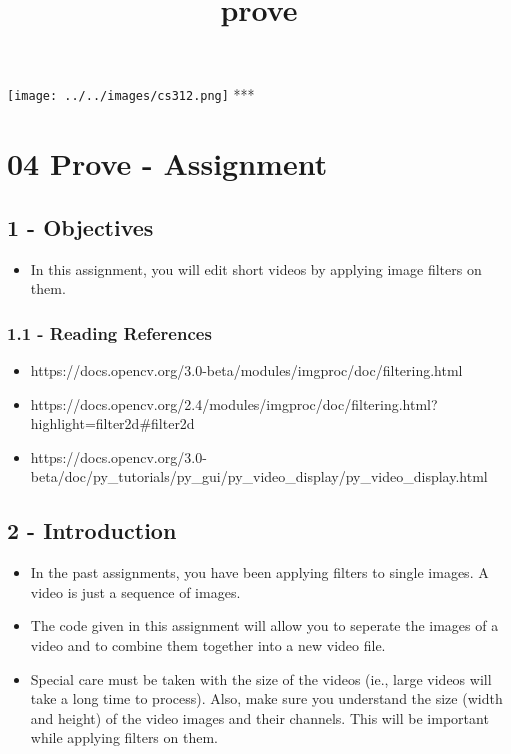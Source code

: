 \documentclass[11pt]{article}
\title{prove}
\makeatletter
\def\maxwidth{\ifdim\Gin@nat@width>\linewidth\linewidth
    \else\Gin@nat@width\fi}
\let\Oldincludegraphics\includegraphics
\renewcommand{\includegraphics}[1]{\Oldincludegraphics[width=.8\maxwidth]{#1}}
\providecommand{\tightlist}{%
      \setlength{\itemsep}{0pt}\setlength{\parskip}{0pt}}
\makeatother
\begin{document}
    
    
    \maketitle
    
    

    
    \texttt{[image: ../../images/cs312.png]} ***

\section{04 Prove - Assignment}\label{prove---assignment}

\subsection{1 - Objectives}\label{objectives}

\begin{itemize}
\tightlist
\item
  In this assignment, you will edit short videos by applying image
  filters on them.
\end{itemize}

\subsubsection{1.1 - Reading References}\label{reading-references}

\begin{itemize}
\tightlist
\item
  https://docs.opencv.org/3.0-beta/modules/imgproc/doc/filtering.html
\item
  https://docs.opencv.org/2.4/modules/imgproc/doc/filtering.html?highlight=filter2d\#filter2d
\item
  https://docs.opencv.org/3.0-beta/doc/py\_tutorials/py\_gui/py\_video\_display/py\_video\_display.html
\end{itemize}

    \subsection{2 - Introduction}\label{introduction}

\begin{itemize}
\tightlist
\item
  In the past assignments, you have been applying filters to single
  images. A video is just a sequence of images.
\item
  The code given in this assignment will allow you to seperate the
  images of a video and to combine them together into a new video file.
\item
  Special care must be taken with the size of the videos (ie., large
  videos will take a long time to process). Also, make sure you
  understand the size (width and height) of the video images and their
  channels. This will be important while applying filters on them.
\end{itemize}
\end{document}
